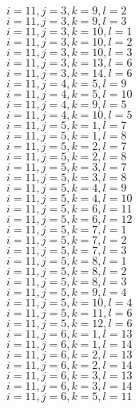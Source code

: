 \documentclass[14pt]{article}
\begin{document}
    $i=11,j=3,k=9,l=2 $ \\ 
    $i=11,j=3,k=9,l=3 $ \\ 
    $i=11,j=3,k=10,l=1 $ \\ 
    $i=11,j=3,k=10,l=2 $ \\ 
    $i=11,j=3,k=10,l=3 $ \\ 
    $i=11,j=3,k=13,l=6 $ \\ 
    $i=11,j=3,k=14,l=6 $ \\ 
    $i=11,j=4,k=5,l=9 $ \\ 
    $i=11,j=4,k=5,l=10 $ \\ 
    $i=11,j=4,k=9,l=5 $ \\ 
    $i=11,j=4,k=10,l=5 $ \\ 
    $i=11,j=5,k=1,l=7 $ \\ 
    $i=11,j=5,k=1,l=8 $ \\ 
    $i=11,j=5,k=2,l=7 $ \\ 
    $i=11,j=5,k=2,l=8 $ \\ 
    $i=11,j=5,k=3,l=7 $ \\ 
    $i=11,j=5,k=3,l=8 $ \\ 
    $i=11,j=5,k=4,l=9 $ \\ 
    $i=11,j=5,k=4,l=10 $ \\ 
    $i=11,j=5,k=6,l=11 $ \\ 
    $i=11,j=5,k=6,l=12 $ \\ 
    $i=11,j=5,k=7,l=1 $ \\ 
    $i=11,j=5,k=7,l=2 $ \\ 
    $i=11,j=5,k=7,l=3 $ \\ 
    $i=11,j=5,k=8,l=1 $ \\ 
    $i=11,j=5,k=8,l=2 $ \\ 
    $i=11,j=5,k=8,l=3 $ \\ 
    $i=11,j=5,k=9,l=4 $ \\ 
    $i=11,j=5,k=10,l=4 $ \\ 
    $i=11,j=5,k=11,l=6 $ \\ 
    $i=11,j=5,k=12,l=6 $ \\ 
    $i=11,j=6,k=1,l=13 $ \\ 
    $i=11,j=6,k=1,l=14 $ \\ 
    $i=11,j=6,k=2,l=13 $ \\ 
    $i=11,j=6,k=2,l=14 $ \\ 
    $i=11,j=6,k=3,l=13 $ \\ 
    $i=11,j=6,k=3,l=14 $ \\ 
    $i=11,j=6,k=5,l=11 $ \\ 
\end{document}
